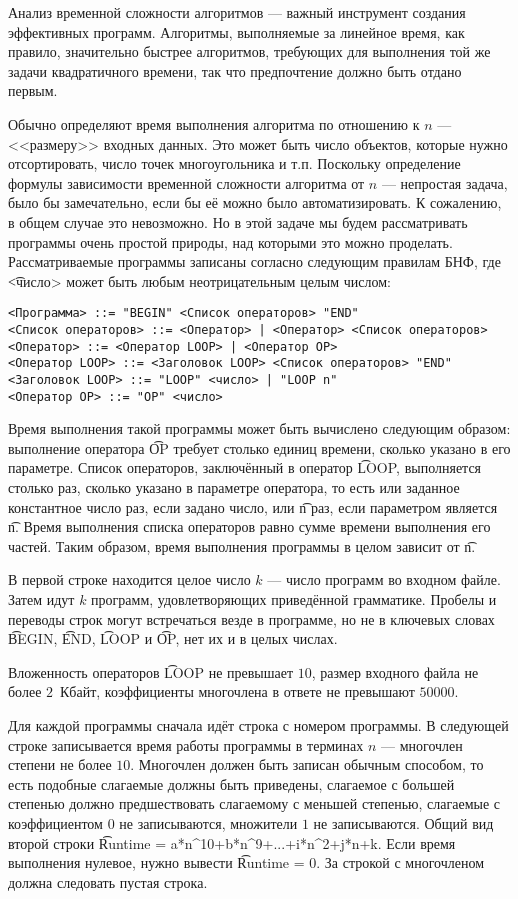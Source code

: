 Анализ временной сложности алгоритмов --- важный инструмент создания эффективных программ. Алгоритмы, выполняемые за линейное время, как правило, значительно быстрее алгоритмов, требующих для выполнения той же задачи квадратичного времени, так что предпочтение должно быть отдано первым. 

Обычно определяют время выполнения алгоритма по отношению к $n$ --- <<размеру>> входных данных. Это может быть число объектов, которые нужно отсортировать, число точек многоугольника и т.п. Поскольку определение формулы зависимости временной сложности алгоритма от $n$ --- непростая задача, было бы замечательно, если бы её можно было автоматизировать. К сожалению, в общем случае это невозможно. Но в этой задаче мы будем рассматривать программы очень простой природы, над которыми это можно проделать. Рассматриваемые программы записаны согласно следующим правилам БНФ, где \t{<число>} может быть любым неотрицательным целым числом:
\begin{verbatim}
<Программа> ::= "BEGIN" <Список операторов> "END"
<Список операторов> ::= <Оператор> | <Оператор> <Список операторов>
<Оператор> ::= <Оператор LOOP> | <Оператор OP>
<Оператор LOOP> ::= <Заголовок LOOP> <Список операторов> "END"
<Заголовок LOOP> ::= "LOOP" <число> | "LOOP n"
<Оператор OP> ::= "OP" <число>
\end{verbatim}

Время выполнения такой программы может быть вычислено следующим образом: выполнение оператора \t{OP} требует столько единиц времени, сколько указано в его параметре. Список операторов, заключённый в оператор \t{LOOP}, выполняется столько раз, сколько указано в параметре оператора, то есть или заданное константное число раз, если задано число, или \t{n} раз, если параметром является \t{n}. Время выполнения списка операторов равно сумме времени выполнения его частей. Таким образом, время выполнения программы в целом зависит от \t{n}. 


\InputFile

В первой строке находится целое число $k$ --- число программ во входном файле. Затем идут $k$ программ, удовлетворяющих приведённой грамматике. Пробелы и переводы строк могут встречаться везде в программе, но не в ключевых словах \t{BEGIN}, \t{END}, \t{LOOP} и \t{OP}, нет их и в целых числах. 

Вложенность операторов \t{LOOP} не превышает $10$, размер входного файла не более $2$~Кбайт, коэффициенты многочлена в ответе не превышают $50000$. 

\OutputFile

Для каждой программы сначала идёт строка с номером программы. В следующей строке записывается время работы программы в терминах $n$ --- многочлен степени не более $10$. Многочлен должен быть записан обычным способом, то есть подобные слагаемые должны быть приведены, слагаемое с большей степенью должно предшествовать слагаемому с меньшей степенью, слагаемые с коэффициентом $0$ не записываются, множители $1$ не записываются. Общий вид второй строки \t{Runtime = a*n\^{}10+b*n\^{}9+...+i*n\^{}2+j*n+k}. Если время выполнения нулевое, нужно вывести \t{Runtime = 0}. За строкой с многочленом должна следовать пустая строка. 


\SAMPLES
